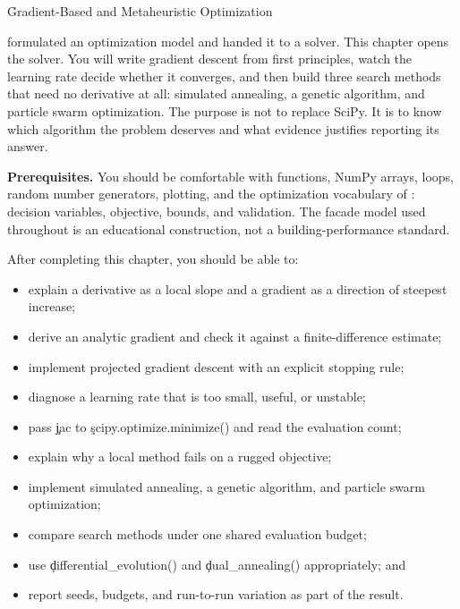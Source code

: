 
\h{Gradient-Based and Metaheuristic Optimization}
\label{ch:20}

 formulated an optimization model and handed it to a
solver. This chapter opens the solver. You will write gradient descent from
first principles, watch the learning rate decide whether it converges, and then
build three search methods that need no derivative at all: simulated annealing,
a genetic algorithm, and particle swarm optimization. The purpose is not to
replace SciPy. It is to know which algorithm the problem deserves and what
evidence justifies reporting its answer.

\begin{NoteBox}
\textbf{Prerequisites.} You should be comfortable with functions, NumPy arrays,
loops, random number generators, plotting, and the optimization vocabulary of
: decision variables, objective, bounds, and
validation. The facade model used throughout is an educational construction,
not a building-performance standard.
\end{NoteBox}

\begin{tcolorbox}[title=Learning outcomes,colframe=orange,colback=white,arc=2mm]
After completing this chapter, you should be able to:
\begin{itemize}
    \item explain a derivative as a local slope and a gradient as a direction of steepest increase;
    \item derive an analytic gradient and check it against a finite-difference estimate;
    \item implement projected gradient descent with an explicit stopping rule;
    \item diagnose a learning rate that is too small, useful, or unstable;
    \item pass \c{jac} to \c{scipy.optimize.minimize()} and read the evaluation count;
    \item explain why a local method fails on a rugged objective;
    \item implement simulated annealing, a genetic algorithm, and particle swarm optimization;
    \item compare search methods under one shared evaluation budget;
    \item use \c{differential_evolution()} and \c{dual_annealing()} appropriately; and
    \item report seeds, budgets, and run-to-run variation as part of the result.
\end{itemize}
\end{tcolorbox}

